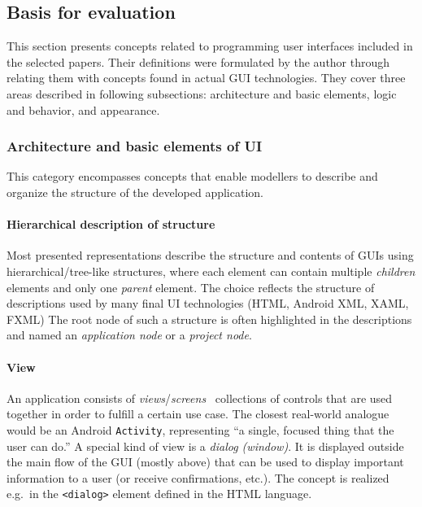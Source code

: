 \subsection{Basis for evaluation}\label{subsec:basis-for-evaluation}

This section presents concepts related to programming user interfaces included in the selected papers.
Their definitions were formulated by the author through relating them with concepts found in actual GUI technologies.
They cover three areas described in following subsections: architecture and basic elements, logic and behavior, and appearance.

\subsubsection{Architecture and basic elements of UI}
This category encompasses concepts that enable modellers to describe and organize the structure of the developed application.

\paragraph{Hierarchical description of structure}
Most presented representations describe the structure and contents of GUIs using hierarchical/tree-like structures, where each element can contain multiple \emph{children} elements and only one \emph{parent} element.
The choice reflects the structure of descriptions used by many final UI technologies (HTML, Android XML, XAML, FXML)
The root node of such a structure is often highlighted in the descriptions and named an \emph{application node} or a \emph{project node}.

\paragraph{View}
An application consists of \emph{views}/\emph{screens} \textendash\ collections of controls that are used together in order to fulfill a certain use case.
The closest real-world analogue would be an Android \texttt{Activity}, representing \enquote{a single, focused thing that the user can do.}
A special kind of view is a \emph{dialog (window)}.
It is displayed outside the main flow of the GUI (mostly above) that can be used to display important information to a user (or receive confirmations, etc.).
The concept is realized e.g.\ in the \texttt{<dialog>} element defined in the HTML language.


